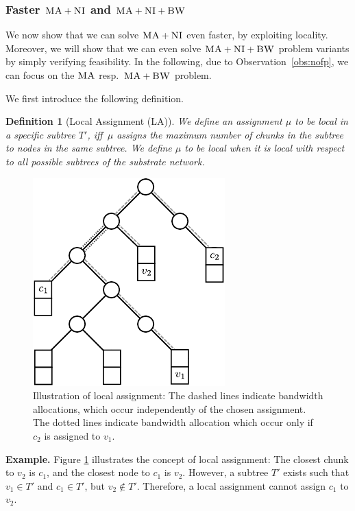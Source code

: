 \documentclass[preprint,12pt]{elsarticle}
\newcommand{\VmChunkAssignment}{\mu}
\newcommand{\CC}{\textsc{NI}}
\newcommand{\BW}{\textsc{BW}}
\newcommand{\MA}{\textsc{MA}}
\newtheorem{defn}{Definition}
\newcommand{\Tree}{\ensuremath{T}}
\begin{document}
\subsubsection{Faster $\MA+\CC$ and $\MA+\CC+\BW$}

We now show that we can solve $\MA+\CC$ even faster, by exploiting
locality. Moreover, we will show that we can
even solve
$\MA+\CC+\BW$ problem variants by simply
verifying feasibility.
In the following, due to Observation~\ref{obs:nofp}, we can focus on
the $\MA$ resp.~$\MA+\BW$ problem.

We first introduce the following definition.
\begin{defn}[Local Assignment (LA)]\label{def:loc}
We define an assignment $\VmChunkAssignment$ to
be \emph{local in a specific subtree $\Tree'$}, iff~$\VmChunkAssignment$
assigns the maximum number of chunks in the
subtree to nodes in the same subtree.
We define $\VmChunkAssignment$ to be \emph{local} when
it is local with respect to all possible subtrees of the substrate network.
\end{defn}

\begin{figure}
\center
\includegraphics[width = 0.45\columnwidth]{figs/unbalanced_tree}
\caption{Illustration of local assignment: The dashed lines indicate bandwidth allocations, which occur
independently of the chosen assignment. The dotted lines indicate bandwidth
allocation which occur only if $c_2$ is assigned to $v_1$.}
\label{fig:unbalanced_tree}
\end{figure}

\textbf{Example.}
Figure \ref{fig:unbalanced_tree} illustrates the concept of local assignment:
The closest chunk to $v_2$ is $c_1$, and the closest node to $c_1$ is $v_2$.
However, a subtree $T'$ exists such that $v_1 \in T'$ and $c_1
\in T'$, but $v_2 \notin T'$. Therefore, a local assignment cannot assign $c_1$ to $v_2$.
\end{document}
